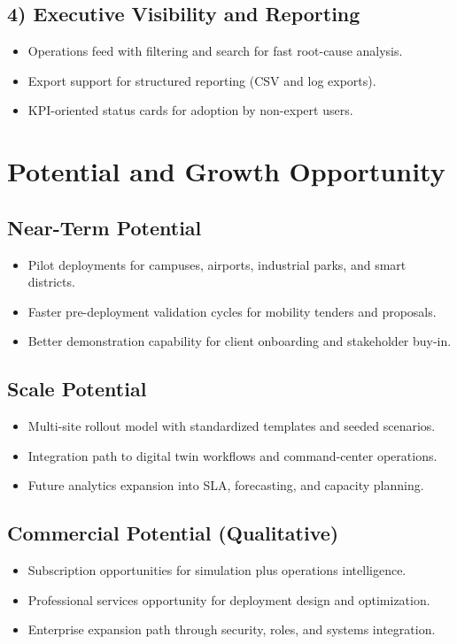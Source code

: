 \documentclass[11pt,a4paper]{article}
\begin{document}
\subsection*{4) Executive Visibility and Reporting}
\begin{itemize}
  \item Operations feed with filtering and search for fast root-cause analysis.
  \item Export support for structured reporting (CSV and log exports).
  \item KPI-oriented status cards for adoption by non-expert users.
\end{itemize}

\section{Potential and Growth Opportunity}
\subsection*{Near-Term Potential}
\begin{itemize}
  \item Pilot deployments for campuses, airports, industrial parks, and smart districts.
  \item Faster pre-deployment validation cycles for mobility tenders and proposals.
  \item Better demonstration capability for client onboarding and stakeholder buy-in.
\end{itemize}

\subsection*{Scale Potential}
\begin{itemize}
  \item Multi-site rollout model with standardized templates and seeded scenarios.
  \item Integration path to digital twin workflows and command-center operations.
  \item Future analytics expansion into SLA, forecasting, and capacity planning.
\end{itemize}

\subsection*{Commercial Potential (Qualitative)}
\begin{itemize}
  \item Subscription opportunities for simulation plus operations intelligence.
  \item Professional services opportunity for deployment design and optimization.
  \item Enterprise expansion path through security, roles, and systems integration.
\end{itemize}
\end{document}
